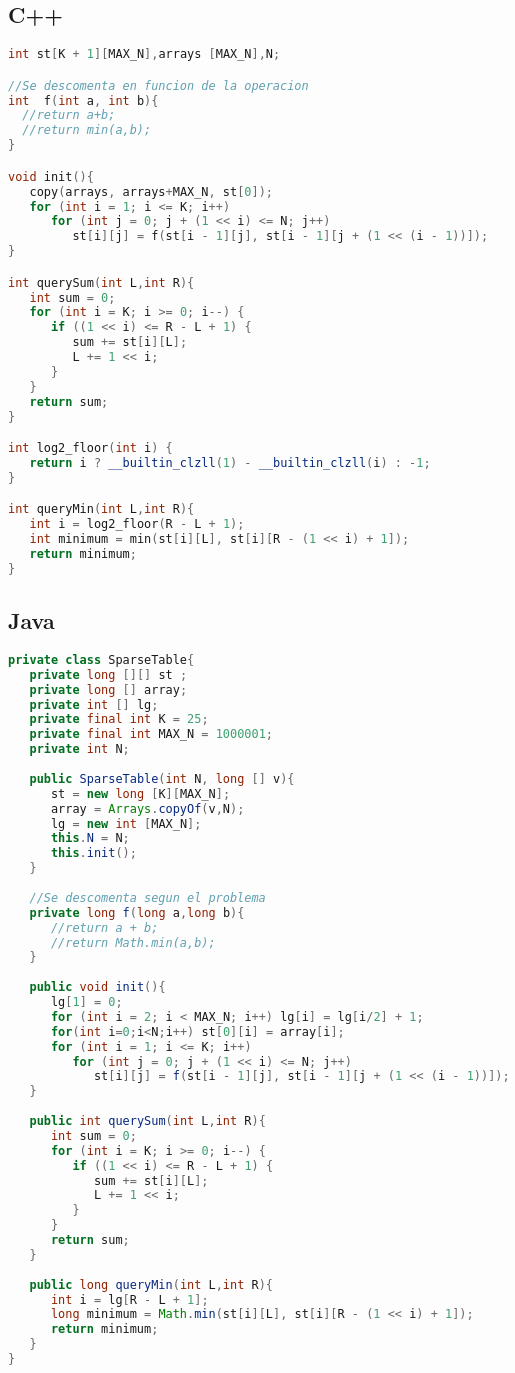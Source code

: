 \subsection{C++}
\begin{lstlisting}[language=C++]
int st[K + 1][MAX_N],arrays [MAX_N],N;

//Se descomenta en funcion de la operacion
int  f(int a, int b){
  //return a+b;
  //return min(a,b);
}

void init(){
   copy(arrays, arrays+MAX_N, st[0]);
   for (int i = 1; i <= K; i++)
      for (int j = 0; j + (1 << i) <= N; j++)
         st[i][j] = f(st[i - 1][j], st[i - 1][j + (1 << (i - 1))]);
}

int querySum(int L,int R){
   int sum = 0;
   for (int i = K; i >= 0; i--) {
      if ((1 << i) <= R - L + 1) {
         sum += st[i][L];
         L += 1 << i;
      }
   }
   return sum;
}

int log2_floor(int i) {
   return i ? __builtin_clzll(1) - __builtin_clzll(i) : -1;
}

int queryMin(int L,int R){
   int i = log2_floor(R - L + 1);
   int minimum = min(st[i][L], st[i][R - (1 << i) + 1]);
   return minimum;
}

\end{lstlisting} 

\subsection{Java}
\begin{lstlisting}[language=Java]
private class SparseTable{
   private long [][] st ;
   private long [] array;
   private int [] lg;
   private final int K = 25;
   private final int MAX_N = 1000001;
   private int N;
	
   public SparseTable(int N, long [] v){
      st = new long [K][MAX_N];
      array = Arrays.copyOf(v,N);
      lg = new int [MAX_N];
      this.N = N;
      this.init();
   }
   
   //Se descomenta segun el problema	
   private long f(long a,long b){
      //return a + b;
      //return Math.min(a,b);
   }
	
   public void init(){
      lg[1] = 0;
      for (int i = 2; i < MAX_N; i++) lg[i] = lg[i/2] + 1;
      for(int i=0;i<N;i++) st[0][i] = array[i];
      for (int i = 1; i <= K; i++)
	     for (int j = 0; j + (1 << i) <= N; j++)
            st[i][j] = f(st[i - 1][j], st[i - 1][j + (1 << (i - 1))]);
   }
	
   public int querySum(int L,int R){
      int sum = 0;
      for (int i = K; i >= 0; i--) {
         if ((1 << i) <= R - L + 1) {
            sum += st[i][L];
            L += 1 << i;
         }
      }
      return sum;
   }
	
   public long queryMin(int L,int R){
      int i = lg[R - L + 1];
      long minimum = Math.min(st[i][L], st[i][R - (1 << i) + 1]);
      return minimum;
   }
}
\end{lstlisting}